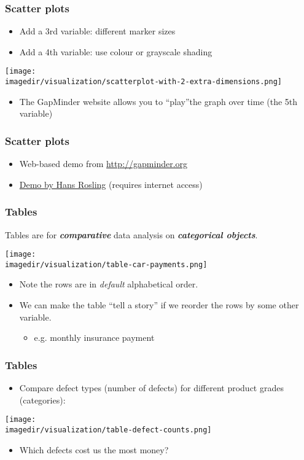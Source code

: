 \begin{frame}\frametitle{Scatter plots}
	\begin{itemize}
		\item	Add a 3rd variable: different marker sizes 
		\item	Add a 4th variable: use colour or grayscale shading 
	\end{itemize}
	\begin{center}
		\texttt{[image: \\imagedir/visualization/scatterplot-with-2-extra-dimensions.png]}
	\end{center}
	\begin{itemize}
		\item	The GapMinder website allows you to ``play''the graph over time (the 5th variable) 
	\end{itemize}
\end{frame}

\begin{frame}\frametitle{Scatter plots}
	\begin{itemize}
		\item	Web-based demo from \href{http://gapminder.org}{http://gapminder.org} 
		\item	\href{http://www.youtube.com/v/jbkSRLYSojo}{Demo by Hans Rosling} (requires internet access) 
	\end{itemize}
\end{frame}

\begin{frame}\frametitle{Tables}
	
	Tables are for \textbf{\emph{comparative}} data analysis on \textbf{\emph{categorical objects}}.
	\begin{center}
		\texttt{[image: \\imagedir/visualization/table-car-payments.png]}
	\end{center}
	\begin{itemize}
		\item	Note the rows are in \emph{default} alphabetical order. 
		\item	We can make the table ``tell a story'' if we reorder the rows by some other variable. 
		\begin{itemize}
			\item	e.g. monthly insurance payment 
		\end{itemize}
	\end{itemize}
\end{frame}

\begin{frame}\frametitle{Tables}
	\begin{itemize}
		\item	Compare defect types (number of defects) for different product grades (categories): 
	\end{itemize}
	\begin{center}
		\texttt{[image: \\imagedir/visualization/table-defect-counts.png]}
	\end{center}
	\begin{itemize}
		\item	Which defects cost us the most money? 
	\end{itemize}
\end{frame}

